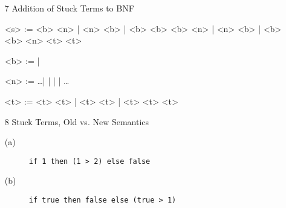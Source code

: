 \documentclass{article}
\begin{document}
\begin{description}
\begin{enumerate}
\begin{proof}
\begin{enumerate}
        \item E-Step:
            The last rule in derivation of $t\ \longrightarrow\ t$ can be 3 cases:
            \begin{enumerate}
            \item E-App1: Then we know $t$ is of form $(t1\ t2)$ and $t_1\ \longrightarrow\ t_1'$.
            \item E-App2: Then we know $t$ is of form $(v1\ t2)$ and $t_2\ \longrightarrow\ t_2'$.
            \item E-AppBeta: Then we know $t$ is of form $(t1\ v2)$.

            \verb|t|$_1$ must take a step to some \verb|t|$_1''$. By the inductive hypothesis, since we know \verb|t|$_1$ steps to both \verb|t|$_1'$ and \verb|t|$_1''$,
            then \verb|t|$_1'$ and \verb|t|$_1''$ must be the same.
            \end{enumerate}


        \item E-Trans: \verb|t|$_1$ must take a step to some \verb|t|$_1'$, and \verb|t| has the form
        \verb|if t|$_1$ \verb|then t|$_2$ \verb|else t|$_3$.


      \end{enumerate}
    \end{proof}

  \item[7]{Addition of Stuck Terms to BNF}

    \begin{grammar}
      <s> :=  <b>  \lit*{+} <n> | <n> \lit*{+} <b> | <b> \lit*{+} <b>
      \alt <b>  \lit*{>} <n> | <n> \lit*{>} <b> | <b> \lit*{>} <b>
      \alt {} <n>  <t>  <t>

      <b> :=  | 

      <n> := \ldots |  |  |  | \ldots

      <t> := <t> \lit*{+} <t> | <t> \lit*{>} <t> |  <t>  <t>  <t>
    \end{grammar}

  \item[8]{Stuck Terms, Old vs. New Semantics}
    \begin{description}
      \item[(a)] \verb|if 1 then (1 > 2) else false|
      \item[(b)] \verb|if true then false else (true > 1)|
    \end{description}


\end{enumerate}
\end{description}
\end{document}
